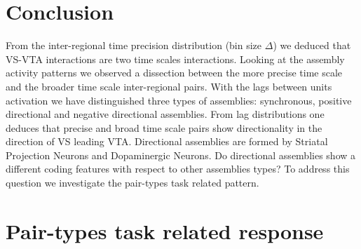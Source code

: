 \section{Conclusion}
From the inter-regional time precision distribution (bin size $\Delta$) we deduced that VS-VTA interactions are two time scales interactions. Looking at the assembly activity patterns we observed a dissection between the more precise time scale and the broader time scale inter-regional pairs. 
With the lags between units activation we have distinguished three types of assemblies: synchronous, positive directional and negative directional assemblies. From lag distributions one deduces that precise and broad time scale pairs show directionality in the direction of VS leading VTA.
Directional assemblies are formed by Striatal Projection Neurons and Dopaminergic Neurons.
Do directional assemblies show a different coding features with respect to other assemblies types?
To address this question we investigate the pair-types task related pattern.
  
 \section{Pair-types task related response}

